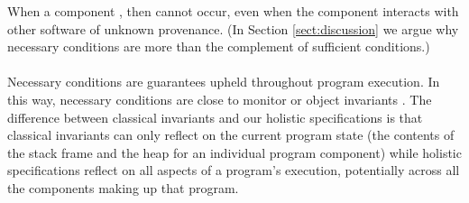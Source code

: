 When a component ,
then  cannot occur, even when the
component interacts with other software of unknown provenance.
(In Section \ref{sect:discussion} we argue why necessary conditions are more than the complement of
sufficient conditions.)

 
\paragraph{ } Necessary conditions are guarantees upheld throughout program execution.
In this way, 
necessary conditions are close to monitor or object
invariants \cite{Hoare74,Meyer97}. The difference between 
classical invariants and our holistic specifications is that classical invariants can only reflect  on
the current program state (\ie the contents of the
stack frame and the heap for an individual program component) while
holistic specifications reflect on all aspects of a program's
execution, potentially across all the components making up that program.


